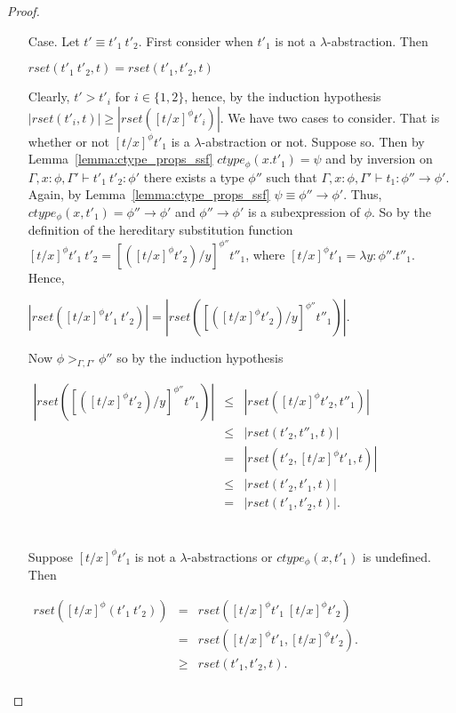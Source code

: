 \begin{proof}
\begin{itemize}
\item[Case.] Let $t' \equiv t'_1\ t'_2$.  First consider when $t'_1$ is not a $\lambda$-abstraction. Then
  \begin{center}
    $rset(t'_1\ t'_2, t) = rset(t'_1, t'_2, t)$
  \end{center}  
  Clearly,  $t' > t'_i$ for $i \in \{1,2\}$, hence, by the induction hypothesis $|rset(t'_i,t)| \geq |rset([t/x]^\phi t'_i)|$.  
  We have two cases to consider.  That is whether or not $[t/x]^\phi t'_1$ is a $\lambda$-abstraction or not.  Suppose so.
  Then by Lemma~\ref{lemma:ctype_props_ssf} $ctype_\phi(x.t'_1) = \psi$ and by inversion on $\Gamma,x:\phi,\Gamma' \vdash t'_1\ t'_2:\phi'$
  there exists a type $\phi''$ such that $\Gamma,x:\phi,\Gamma' \vdash t_1:\phi'' \to \phi'$.  Again, by Lemma~\ref{lemma:ctype_props_ssf}
  $\psi \equiv \phi'' \to \phi'$. Thus, $ctype_\phi(x,t'_1) = \phi'' \to \phi'$ and $\phi'' \to \phi'$ is a subexpression of $\phi$.
  So by the definition of the hereditary substitution function $[t/x]^\phi t'_1\ t'_2 = [([t/x]^\phi t'_2)/y]^{\phi''} t''_1$, where
  $[t/x]^\phi t'_1 = \lambda y:\phi''.t''_1$.  Hence,
  \begin{center}
    \begin{math}
      |rset([t/x]^\phi t'_1\ t'_2)| = |rset([([t/x]^\phi t'_2)/y]^{\phi''} t''_1)|.
    \end{math}
  \end{center}
  Now $\phi >_{\Gamma,\Gamma'} \phi''$ so by the induction hypothesis 
  \begin{center}
    \begin{math}
      \begin{array}{lll}
        |rset([([t/x]^\phi t'_2)/y]^{\phi''} t''_1)| & \leq & |rset([t/x]^\phi t'_2, t''_1)|\\
        & \leq & |rset(t'_2, t''_1, t)|\\
        & = & |rset(t'_2, [t/x]^\phi t'_1, t)|\\
        & \leq & |rset(t'_2, t'_1, t)|\\
        & = & |rset(t'_1, t'_2, t)|.\\
      \end{array}
    \end{math}
  \end{center}
  
  \ \\
  \noindent
  Suppose $[t/x]^\phi t'_1$ is not a $\lambda$-abstractions or $ctype_\phi(x,t'_1)$ is undefined.  Then
  \begin{center}
    \begin{math}
      \begin{array}{lll}
        rset([t/x]^\phi (t'_1\ t'_2)) & = & rset([t/x]^\phi t'_1\ [t/x]^\phi t'_2)\\
        & = & rset([t/x]^\phi t'_1, [t/x]^\phi t'_2).\\
        & \geq & rset(t'_1, t'_2, t).\\
      \end{array}
    \end{math}
  \end{center}
  

\end{itemize}
\end{proof}
